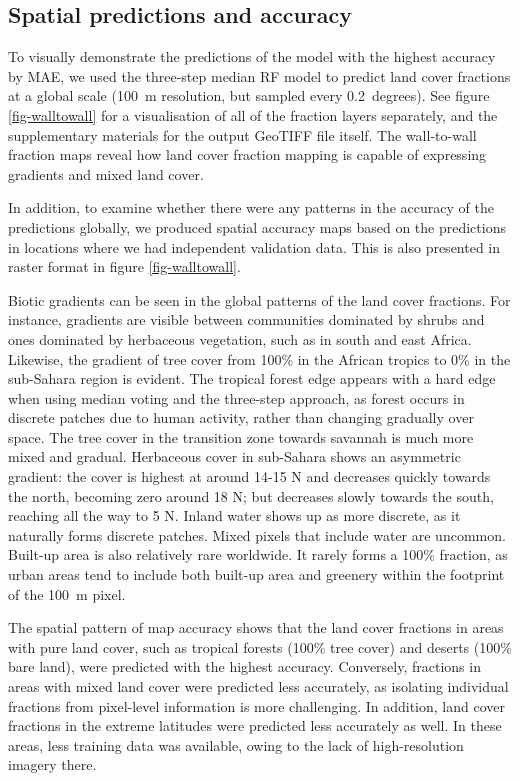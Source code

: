 \documentclass[review,authoryear,3p]{elsarticle}
\begin{document}
\subsection{Spatial predictions and accuracy}

To visually demonstrate the predictions of the model with the highest accuracy by \gls{MAE}, we used the three-step median \gls{RF} model to predict land cover fractions at a global scale (100~m resolution, but sampled every 0.2~degrees).
See figure \ref{fig-walltowall} for a visualisation of all of the fraction layers separately, and the supplementary materials for the output GeoTIFF file itself.
The wall-to-wall fraction maps reveal how land cover fraction mapping is capable of expressing gradients and mixed land cover.

In addition, to examine whether there were any patterns in the accuracy of the predictions globally, we produced spatial accuracy maps based on the predictions in locations where we had independent validation data.
This is also presented in raster format in figure \ref{fig-walltowall}.

Biotic gradients can be seen in the global patterns of the land cover fractions.
For instance, gradients are visible between communities dominated by shrubs and ones dominated by herbaceous vegetation, such as in south and east Africa.
Likewise, the gradient of tree cover from 100\% in the African tropics to 0\% in the sub-Sahara region is evident.
The tropical forest edge appears with a hard edge when using median voting and the three-step approach, as forest occurs in discrete patches due to human activity, rather than changing gradually over space.
The tree cover in the transition zone towards savannah is much more mixed and gradual.
Herbaceous cover in sub-Sahara shows an asymmetric gradient: the cover is highest at around 14-15\textdegree{} N and decreases quickly towards the north, becoming zero around 18\textdegree{} N; but decreases slowly towards the south, reaching all the way to 5\textdegree{} N.
Inland water shows up as more discrete, as it naturally forms discrete patches.
Mixed pixels that include water are uncommon.
Built-up area is also relatively rare worldwide.
It rarely forms a 100\% fraction, as urban areas tend to include both built-up area and greenery within the footprint of the 100~m pixel.

The spatial pattern of map accuracy shows that the land cover fractions in areas with pure land cover, such as tropical forests (100\% tree cover) and deserts (100\% bare land), were predicted with the highest accuracy.
Conversely, fractions in areas with mixed land cover were predicted less accurately, as isolating individual fractions from pixel-level information is more challenging.
In addition, land cover fractions in the extreme latitudes were predicted less accurately as well.
In these areas, less training data was available, owing to the lack of high-resolution imagery there.
\end{document}
